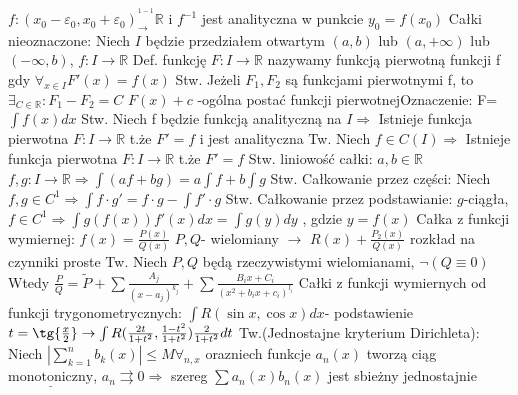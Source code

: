 \documentclass{article}
\begin{document}
$f:(x_0-\varepsilon_0,x_0+\varepsilon_0)_{\longrightarrow}^{^{1-1}}\mathbb{R}$ i $f^{-1}$ jest analityczna w punkcie $y_0=f(x_0)$\newline\newline
Całki nieoznaczone:\newline
Niech $I$ będzie przedziałem otwartym $(a,b)$ lub $(a,+\infty)$ lub $(-\infty,b)$, $f:I\rightarrow\mathbb{R}$\newline
Def. funkcję $F:I\rightarrow\mathbb{R}$ nazywamy funkcją pierwotną funkcji f gdy $\forall_{x\in I}F'(x)=f(x)$\newline
Stw. Jeżeli $F_1,F_2$ są funkcjami pierwotnymi f, to $\exists_{C\in\mathbb{R}}:F_1-F_2=C$\newline
$F(x)+c$ -ogólna postać funkcji pierwotnej\quad Oznaczenie: F=$\int f(x)dx$\newline
Stw. Niech f będzie funkcją analityczną na $I\Rightarrow$ Istnieje funkcja pierwotna $F:I\rightarrow\mathbb{R}$ t.że $F'=f$ i jest analityczna\newline
Tw. Niech $f\in C(I)\Rightarrow$ Istnieje funkcja pierwotna $F:I\rightarrow\mathbb{R}$ t.że $F'=f$\newline
Stw. liniowość całki: $a,b\in\mathbb{R}$ $f,g:I\rightarrow\mathbb{R}\Rightarrow\int(af+bg)=a\int f+b\int g$\newline
Stw. Całkowanie przez części: Niech $f,g\in C^1\Rightarrow \int f\cdot g'=f\cdot g-\int f'\cdot g$\newline
Stw. Całkowanie przez podstawianie: $g$-ciągła,$f\in C^1\Rightarrow\int g(f(x))f'(x)dx=\int g(y)dy$ , gdzie $y=f(x)$\newline
Całka z funkcji wymiernej: $f(x)=\frac{P(x)}{Q(x)}$ $P,Q$- wielomiany $\rightarrow$ $R(x)+\frac{P_2(x)}{Q(x)}$ rozkład na czynniki proste\newline
Tw. Niech $P,Q$ będą rzeczywistymi wielomianami, $\neg(Q\equiv0)$ Wtedy 
$\frac{P}{Q}=\widetilde{P}+\sum\frac{A_j}{(x-a_j)^{k_j}}+\sum\frac{B_ix+C_i}{(x^2+b_ix+c_i)^{l_i}}$\newline
Całki z funkcji wymiernych od funkcji trygonometrycznych: $\int R(\sin{x},\cos{x})dx$- 
podstawienie $t=\tg{\frac{x}{2}}\rightarrow \int R(\frac{2t}{1+t^2},\frac{1-t^2}{1+t^2})\frac{2}{1+t^2}dt$\newline
Tw.(Jednostajne kryterium Dirichleta): Niech $|\sum\limits_{k=1}^{n}b_k(x)|\le M \forall_{n,x}$ orazniech funkcje $a_n(x)$ tworzą ciąg 
$\underline{\text{monotoniczny}}$, $a_n\rightrightarrows 0\Rightarrow$ szereg $\sum a_n(x)b_n(x)$ jest sbieżny jednostajnie\newline
\end{document}
